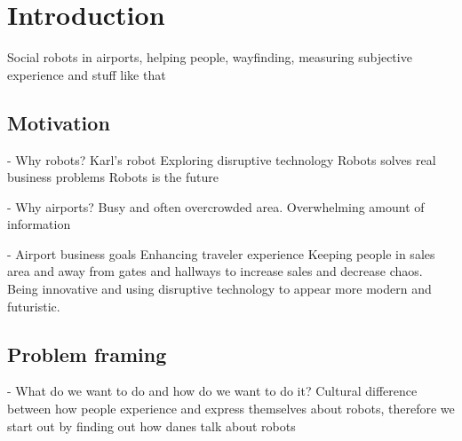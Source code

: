 \section{Introduction}
\label{Introduction}
Social robots in airports, helping people, wayfinding, measuring subjective experience and stuff like that

\subsection{Motivation}
- Why robots?
Karl’s robot
Exploring disruptive technology
Robots solves real business problems
Robots is the future

- Why airports?
Busy and often overcrowded area. Overwhelming amount of information

- Airport business goals
Enhancing traveler experience
Keeping people in sales area and away from gates and hallways to increase sales and decrease chaos.
Being innovative and using disruptive technology to appear more modern and futuristic.

\subsection{Problem framing}
- What do we want to do and how do we want to do it?
Cultural difference between how people experience and express themselves about robots, therefore we start out by finding out how danes talk about robots
